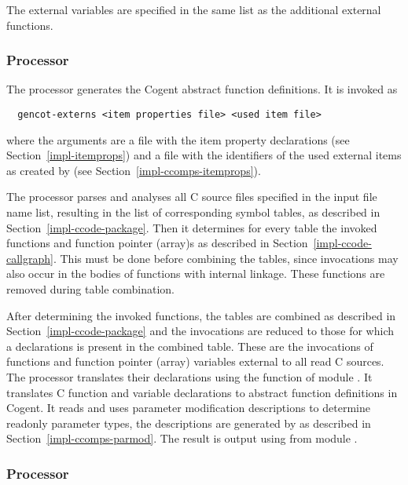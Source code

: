 The external variables are specified in the same list as the additional external functions.

\subsubsection{Processor }

The processor  generates the Cogent abstract function definitions. It is invoked as
\begin{verbatim}
  gencot-externs <item properties file> <used item file>
\end{verbatim}
where the arguments are a file with the item property declarations (see 
Section~\ref{impl-itemprops}) and a file with the identifiers of the used external items as created 
by  (see Section~\ref{impl-ccomps-itemprops}).

The processor parses and analyses
all C source files specified in the input file name list, resulting in the list of corresponding symbol tables, as
described in Section~\ref{impl-ccode-package}. Then
it determines for every table the invoked functions and function pointer (array)s as described in 
Section~\ref{impl-ccode-callgraph}. This must
be done before combining the tables, since invocations may also occur in the bodies of functions with internal
linkage. These functions are removed during table combination.

After determining the invoked functions, the tables are combined as described in Section~\ref{impl-ccode-package}
and the invocations are reduced to those for
which a declarations is present in the combined table. These are the invocations of functions and function
pointer (array) variables external to all
read C sources. The processor translates their declarations using the function  of
module . It translates C function and variable declarations to abstract function 
definitions
in Cogent. It reads and uses parameter modification descriptions to determine readonly parameter types, the
descriptions are generated by  as described in Section~\ref{impl-ccomps-parmod}.
The result is output using  from module .

\subsubsection{Processor }

